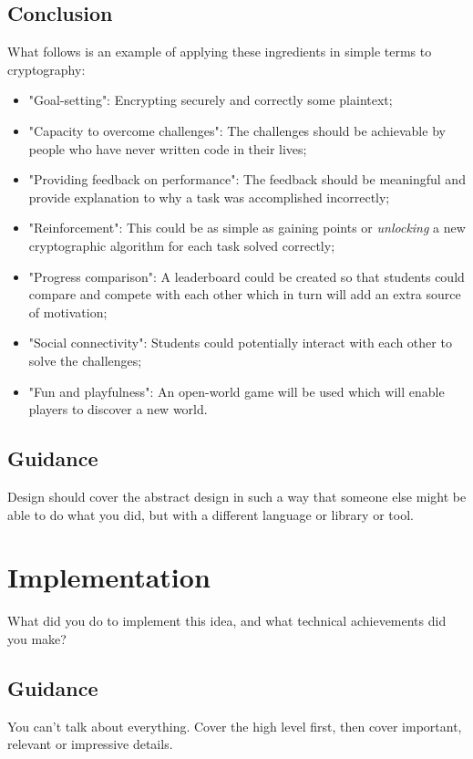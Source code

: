 \documentclass{l4proj}
\begin{document}
\section{Conclusion}

What follows is an example of applying these ingredients in simple terms to cryptography:
\begin{itemize}
    \item "Goal-setting": Encrypting securely and correctly some plaintext;
    \item "Capacity to overcome challenges": The challenges should be achievable by people who have never written code in their lives;
    \item "Providing feedback on performance": The feedback should be meaningful and provide explanation to why a task was accomplished incorrectly;
    \item "Reinforcement": This could be as simple as gaining points or \textit{unlocking} a new cryptographic algorithm for each task solved correctly;
    \item "Progress comparison": A leaderboard could be created so that students could compare and compete with each other which in turn will add an extra source of motivation;
    \item "Social connectivity": Students could potentially interact with each other to solve the challenges;
    \item "Fun and playfulness": An open-world game will be used which will enable players to discover a new world.
\end{itemize}

\section{Guidance}
Design should cover the abstract design in such a way that someone else might be able to do what you did, but with a different language or library or tool.

\chapter{Implementation}
What did you do to implement this idea, and what technical achievements did you make?
\section{Guidance}
You can't talk about everything. Cover the high level first, then cover important, relevant or impressive details.
\end{document}
